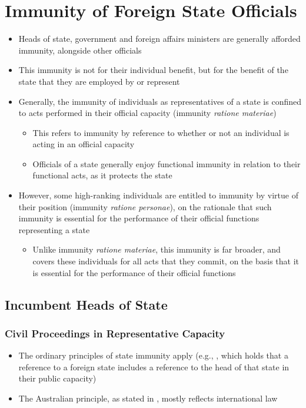 \section{Immunity of Foreign State Officials}
\begin{itemize}
    \item Heads of state, government and foreign affairs ministers are generally afforded immunity, alongside other officials
    \item This immunity is not for their individual benefit, but for the benefit of the state that they are employed by or represent
    \item Generally, the immunity of individuals as representatives of a state is confined to acts performed in their official capacity (immunity \textit{ratione materiae})
    \begin{itemize}
        \item This refers to immunity by reference to whether or not an individual is acting in an official capacity
        \item Officials of a state generally enjoy functional immunity in relation to their functional acts, as it protects the state
    \end{itemize}
    \item However, some high-ranking individuals are entitled to immunity by virtue of their position (immunity \textit{ratione personae}), on the rationale that such immunity is essential for the performance of their official functions representing a state
    \begin{itemize}
        \item Unlike immunity \textit{ratione materiae}, this immunity is far broader, and covers these individuals for all acts that they commit, on the basis that it is essential for the performance of their official functions
    \end{itemize}
\end{itemize}

\subsection{Incumbent Heads of State}
\subsubsection{Civil Proceedings in Representative Capacity}
\begin{itemize}
    \item The ordinary principles of state immunity apply (e.g., , which holds that a reference to a foreign state includes a reference to the head of that state in their public capacity)
    \item The Australian principle, as stated in , mostly reflects international law
\end{itemize}

